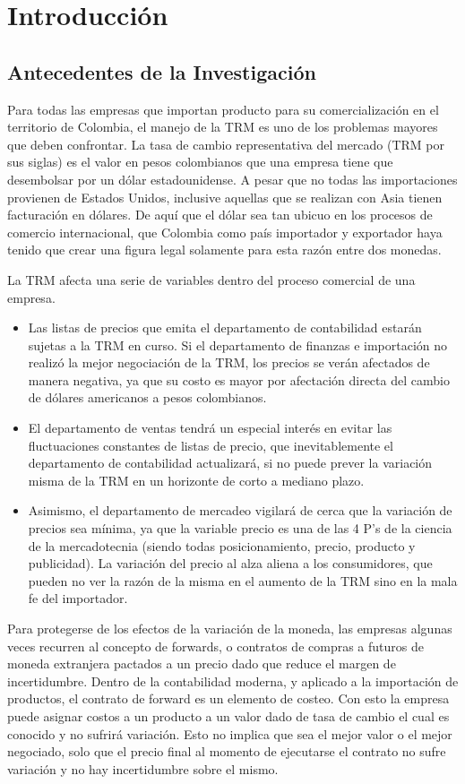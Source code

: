 \documentclass[letterpaper, spanish, 11pt]{report}
\begin{document}
\chapter{Introducción}

\section{Antecedentes de la Investigación}
Para todas las empresas que importan producto para su comercialización en el territorio de Colombia, el manejo de la TRM es uno de los problemas mayores que deben confrontar. La tasa de cambio representativa del mercado (TRM por sus siglas) es el valor en pesos colombianos que una empresa tiene que desembolsar por un dólar estadounidense. A pesar que no todas las importaciones provienen de Estados Unidos, inclusive aquellas que se realizan con Asia tienen facturación en dólares. De aquí que el dólar sea tan ubicuo en los procesos de comercio internacional, que Colombia como país importador y exportador haya tenido que crear una figura legal solamente para esta razón entre dos monedas.

La TRM afecta una serie de variables dentro del proceso comercial de una empresa.

\begin{itemize}
	\item Las listas de precios que emita el departamento de contabilidad estarán sujetas a la TRM en curso. Si el departamento de finanzas e importación no realizó la mejor negociación de la TRM, los precios se verán afectados de manera negativa, ya que su costo es mayor por afectación directa del cambio de dólares americanos a pesos colombianos.
	\item El departamento de ventas tendrá un especial interés en evitar las fluctuaciones constantes de listas de precio, que inevitablemente el departamento de contabilidad actualizará, si no puede prever la variación misma de la TRM en un horizonte de corto a mediano plazo.
	\item Asimismo, el departamento de mercadeo vigilará de cerca que la variación de precios sea mínima, ya que la variable precio es una de las 4 P’s de la ciencia de la mercadotecnia (siendo todas posicionamiento, precio, producto y publicidad). La variación del precio al alza aliena a los consumidores, que pueden no ver la razón de la misma en el aumento de la TRM sino en la mala fe del importador.
\end{itemize}

Para protegerse de los efectos de la variación de la moneda, las empresas algunas veces recurren al concepto de forwards, o contratos de compras a futuros de moneda extranjera pactados a un precio dado que reduce el margen de incertidumbre. Dentro de la contabilidad moderna, y aplicado a la importación de productos, el contrato de forward es un elemento de costeo. Con esto la empresa puede asignar costos a un producto a un valor dado de tasa de cambio el cual es conocido y no sufrirá variación. Esto no implica que sea el mejor valor o el mejor negociado, solo que el precio final al momento de ejecutarse el contrato no sufre variación y no hay incertidumbre sobre el mismo.
\end{document}

